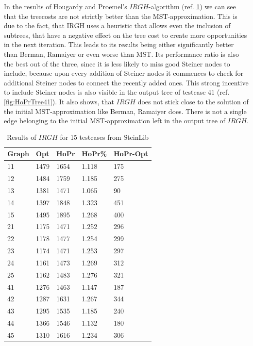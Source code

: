 In the results of Hougardy and Proemel's $IRGH$-algorithm (ref. \ref{tab:HoPrResults}) we can see that the treecosts are not strictly better than the MST-approximation. This is due to the fact, that IRGH uses a heuristic that allows even the inclusion of subtrees, that have a negative effect on the tree cost to create more opportunities in the next iteration. This leads to its results being either significantly better than Berman, Ramaiyer or even worse than MST. Its performance ratio is also the best out of the three, since it is less likely to miss good Steiner nodes to include, because upon every addition of Steiner nodes it commences to check for additional Steiner nodes to connect the recently added ones. This strong incentive to include Steiner nodes is also visible in the output tree of testcase 41 (ref. \ref{fig:HoPrTree41}). It also shows, that $IRGH$ does not stick close to the solution of the initial MST-approximation like Berman, Ramaiyer does. There is not a single edge belonging to the initial MST-approximation left in the output tree of $IRGH$.

\begin{table}[htbp]
 \caption{Results of $IRGH$ for 15 testcases from SteinLib \cite{Dui93}}\label{tab:HoPrResults} 	
 \centering
 \begin{tabular}{l l l l l}
\toprule
Graph & Opt & HoPr & HoPr\% & HoPr-Opt \\
\midrule
11	& 1479	& 1654	& 1.118	& 175 \\
12	& 1484	& 1759	& 1.185	& 275 \\
13	& 1381	& 1471	& 1.065	& 90 	\\
14	& 1397	& 1848	& 1.323	& 451 \\
15	& 1495	& 1895	& 1.268	& 400 \\
\midrule 
21	& 1175	& 1471	& 1.252	& 296 \\
22	& 1178	& 1477	& 1.254	& 299 \\
23	& 1174	& 1471	& 1.253	& 297 \\
24	& 1161	& 1473	& 1.269 	& 312 \\
25	& 1162	& 1483	& 1.276	& 321 \\
\midrule
41	& 1276	& 1463	& 1.147	& 187 \\
42	& 1287	& 1631	& 1.267	& 344 \\
43	& 1295	& 1535	& 1.185	& 240 \\
44	& 1366	& 1546	& 1.132	& 180 \\
45	& 1310	& 1616	& 1.234	& 306 \\
\bottomrule
\end{tabular}
\end{table}

